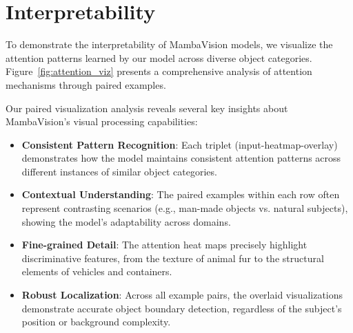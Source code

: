 \section{Interpretability}
\label{sec:interop}

To demonstrate the interpretability of MambaVision models, we visualize the attention patterns learned by our model across diverse object categories. Figure~\ref{fig:attention_viz} presents a comprehensive analysis of attention mechanisms through paired examples.


Our paired visualization analysis reveals several key insights about MambaVision's visual processing capabilities:

\begin{itemize}
    \item \textbf{Consistent Pattern Recognition}: Each triplet (input-heatmap-overlay) demonstrates how the model maintains consistent attention patterns across different instances of similar object categories.
    
    \item \textbf{Contextual Understanding}: The paired examples within each row often represent contrasting scenarios (e.g., man-made objects vs. natural subjects), showing the model's adaptability across domains.
    
    \item \textbf{Fine-grained Detail}: The attention heat maps precisely highlight discriminative features, from the texture of animal fur to the structural elements of vehicles and containers.
    
    \item \textbf{Robust Localization}: Across all example pairs, the overlaid visualizations demonstrate accurate object boundary detection, regardless of the subject's position or background complexity.
\end{itemize}

